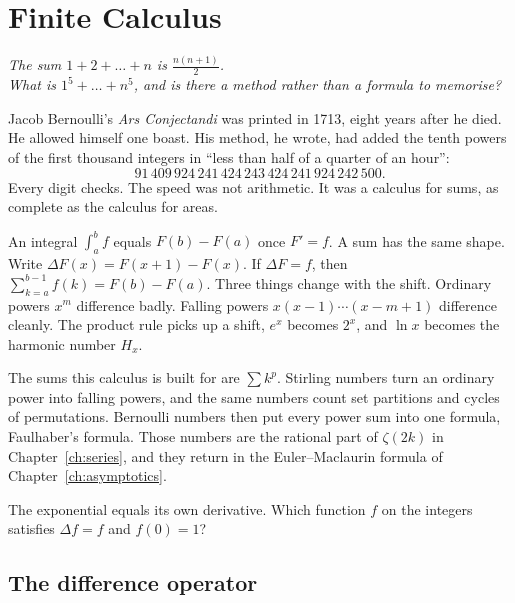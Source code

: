 \chapter{Finite Calculus}\label{ch:finite}

\begin{center}\itshape
The sum $1+2+\dots+n$ is $\frac{n(n+1)}2$.\\
What is $1^5+\dots+n^5$, and is there a method rather than a formula to memorise?
\end{center}

Jacob Bernoulli's \emph{Ars Conjectandi} was printed in 1713, eight years after he died. He allowed himself one boast. His method, he wrote, had added the tenth powers of the first thousand integers in ``less than half of a quarter of an hour'':
\[
91\,409\,924\,241\,424\,243\,424\,241\,924\,242\,500.
\]
Every digit checks. The speed was not arithmetic. It was a calculus for sums, as complete as the calculus for areas.


An integral $\int_a^bf$ equals $F(b)-F(a)$ once $F'=f$. A sum has the same shape. Write $\Delta F(x)=F(x+1)-F(x)$. If $\Delta F=f$, then $\sum_{k=a}^{b-1}f(k)=F(b)-F(a)$. Three things change with the shift. Ordinary powers $x^m$ difference badly. Falling powers $x(x-1)\cdots(x-m+1)$ difference cleanly. The product rule picks up a shift, $e^x$ becomes $2^x$, and $\ln x$ becomes the harmonic number $H_x$.

The sums this calculus is built for are $\sum k^p$. Stirling numbers turn an ordinary power into falling powers, and the same numbers count set partitions and cycles of permutations. Bernoulli numbers then put every power sum into one formula, Faulhaber's formula. Those numbers are the rational part of $\zeta(2k)$ in Chapter~\ref{ch:series}, and they return in the Euler--Maclaurin formula of Chapter~\ref{ch:asymptotics}.

\begin{think}
The exponential equals its own derivative. Which function $f$ on the integers satisfies $\Delta f=f$ and $f(0)=1$?
\end{think}

\section{The difference operator}

